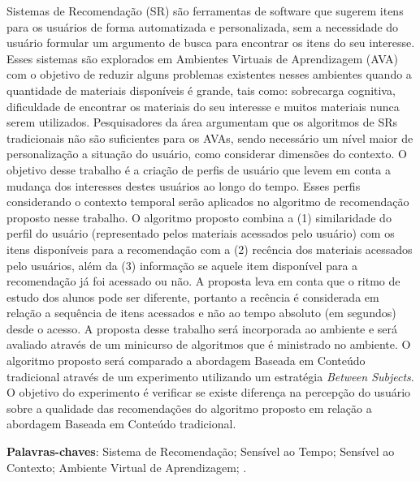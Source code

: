 

\begin{resumo}
  Sistemas de Recomendação (SR) são ferramentas de software que sugerem itens para os usuários de forma automatizada e personalizada,
  sem a necessidade do usuário formular um argumento de busca para encontrar os itens do seu interesse. Esses sistemas são
  explorados em Ambientes Virtuais de Aprendizagem (AVA) com o objetivo de reduzir alguns problemas existentes nesses ambientes
  quando a quantidade de materiais disponíveis é grande, tais como: sobrecarga cognitiva, dificuldade de encontrar os materiais
  do seu interesse e muitos materiais nunca serem utilizados. Pesquisadores da área argumentam que os algoritmos de SRs tradicionais não são suficientes para os AVAs,
  sendo necessário um nível maior de personalização a situação do usuário, como considerar dimensões do contexto. O objetivo
  desse trabalho é a criação de perfis de usuário que levem em conta a mudança dos interesses destes usuários
  ao longo do tempo. Esses perfis considerando o contexto temporal serão aplicados no algoritmo de recomendação proposto nesse
  trabalho. O algoritmo proposto combina a (1) similaridade do perfil do usuário (representado
  pelos materiais acessados pelo usuário) com os itens disponíveis para a recomendação com a (2) recência dos materiais
  acessados pelo usuários, além da (3) informação se aquele item disponível para a recomendação já foi acessado ou não. A
  proposta leva em conta que o ritmo de estudo dos alunos pode ser diferente, portanto a recência é considerada em relação
  a sequência de itens acessados e não ao tempo absoluto (em segundos) desde o acesso. A proposta desse trabalho será
  incorporada ao ambiente \adaptweb e será avaliado através de um minicurso de algoritmos que é ministrado no ambiente.
  O algoritmo proposto será comparado a abordagem Baseada em Conteúdo tradicional através de um experimento utilizando um
  estratégia \textit{Between Subjects}. O objetivo do experimento é verificar se existe diferença na percepção do usuário
  sobre a qualidade das recomendações do algoritmo proposto em relação a abordagem Baseada em Conteúdo tradicional.

  \vspace{\onelineskip}

  \noindent
  \textbf{Palavras-chaves}: Sistema de Recomendação; Sensível ao Tempo; Sensível ao Contexto; Ambiente Virtual de Aprendizagem; \adaptweb.
\end{resumo}

